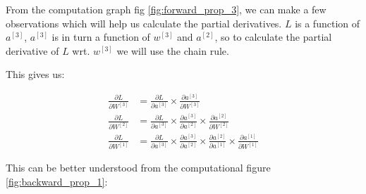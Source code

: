 From the computation graph fig \ref{fig:forward_prop_3}, we can make a few observations which will help us calculate the partial derivatives. $L$ is a function of $a^{[3]}$, $a^{[3]}$ is in turn a function of $w^{[3]}$ and $a^{[2]}$, so to calculate the partial derivative of $L$ wrt. $w^{[3]}$ we will use the chain rule.

This gives us:

\begin{equation} \label{eq:backward_prop_2}
\begin{split}
    \frac{\partial L}{\partial W^{[3]}} &=  \frac{\partial L}{\partial a^{[3]}} \times \frac{\partial a^{[3]}}{\partial W^{[3]}}\\
    \frac{\partial L}{\partial W^{[2]}} &=  \frac{\partial L}{\partial a^{[3]}} \times \frac{\partial a^{[3]}}{\partial a^{[2]}} \times \frac{\partial a^{[2]}}{\partial W^{[2]}}\\
    \frac{\partial L}{\partial W^{[1]}} &=  \frac{\partial L}{\partial a^{[3]}} \times \frac{\partial a^{[3]}}{\partial a^{[2]}} \times \frac{\partial a^{[2]}}{\partial a^{[1]}} \times \frac{\partial a^{[1]}}{\partial W^{[1]}}
\end{split}
\end{equation}

This can be better understood from the computational figure \ref{fig:backward_prop_1}:


